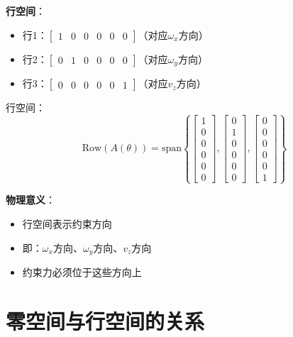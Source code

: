 \documentclass[12pt,a4paper]{article}
\begin{document}
\textbf{行空间}：
\begin{itemize}
\item 行1：$\begin{bmatrix} 1 & 0 & 0 & 0 & 0 & 0 \end{bmatrix}$（对应$\omega_x$方向）
\item 行2：$\begin{bmatrix} 0 & 1 & 0 & 0 & 0 & 0 \end{bmatrix}$（对应$\omega_y$方向）
\item 行3：$\begin{bmatrix} 0 & 0 & 0 & 0 & 0 & 1 \end{bmatrix}$（对应$v_z$方向）
\end{itemize}

行空间：
\begin{equation}
\text{Row}(A(\theta)) = \text{span}\left\{\begin{bmatrix} 1 \\ 0 \\ 0 \\ 0 \\ 0 \\ 0 \end{bmatrix}, \begin{bmatrix} 0 \\ 1 \\ 0 \\ 0 \\ 0 \\ 0 \end{bmatrix}, \begin{bmatrix} 0 \\ 0 \\ 0 \\ 0 \\ 0 \\ 1 \end{bmatrix}\right\}
\end{equation}

\textbf{物理意义}：
\begin{itemize}
\item 行空间表示约束方向
\item 即：$\omega_x$方向、$\omega_y$方向、$v_z$方向
\item 约束力必须位于这些方向上
\end{itemize}

\section{零空间与行空间的关系}
\end{document}
